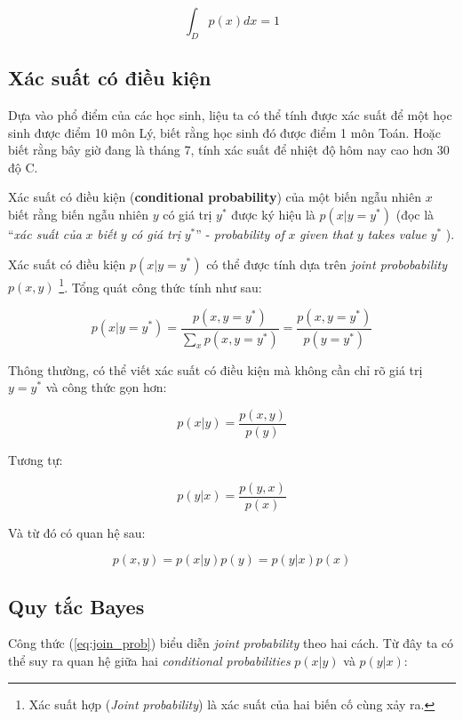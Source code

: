 \documentclass[../main-report.tex]{subfiles}
\begin{document}
\begin{equation}
\int_{D}p(x)dx=1
\end{equation}

\subsection{Xác suất có điều kiện}
Dựa vào phổ điểm của các học sinh, liệu ta có thể tính được xác suất để một học sinh được điểm 10 môn Lý, biết rằng học sinh đó được điểm 1 môn Toán. Hoặc biết rằng bây giờ đang là tháng 7, tính xác suất để nhiệt độ hôm nay cao hơn 30 độ C.

Xác suất có điều kiện (\textbf{conditional probability}) của một biến ngẫu nhiên $x$ biết rằng biến ngẫu nhiên $y$ có giá trị $y^{*}$ được ký hiệu là $p(x | y = y^{*})$ (đọc là ``\textit{xác suất của} $x$ \textit{biết} $y$ \textit{có giá trị} $y^{*}$'' - \textit{probability of} $x$ \textit{given that} $y$ \textit{takes value} $y^{*}$ ).

Xác suất có điều kiện \(p(x | y = y^*)\) có thể được tính dựa trên \textit{joint probobability} \(p(x, y)\) \footnote{Xác suất hợp (\textit{Joint probability}) là xác suất của hai biến cố cùng xảy ra.}. Tổng quát công thức tính như sau:

\begin{equation}
  p(x | y = y^*) = \frac{p(x, y = y^*)}{\sum_{x} p(x, y = y^*)} = \frac{p(x, y = y^*)}{p(y = y^*)}
\end{equation}

Thông thường, có thể viết xác suất có điều kiện mà không cần chỉ rõ giá trị \(y = y^*\) và công thức gọn hơn:

\begin{equation}
	p(x | y) = \frac{p(x, y)}{p(y)}
\end{equation}
  
Tương tự:

\begin{equation}
  p(y | x) = \frac{p(y, x)}{p(x)}
\end{equation}

Và từ đó có quan hệ sau:

\begin{equation} \label{eq:join_prob}
  p(x, y) = p(x | y)p(y) = p(y | x)p(x)
\end{equation}

\subsection{Quy tắc Bayes}
Công thức (\ref{eq:join_prob}) biểu diễn \textit{joint probability} theo hai cách. Từ đây ta có thể suy ra quan hệ giữa hai \textit{conditional probabilities} \(p(x |y)\) và \(p(y | x)\):
\end{document}
